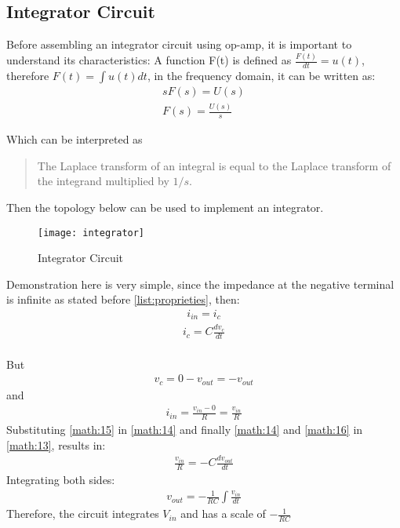 \documentclass[journal]{IEEEtran}
\begin{document}
        \subsection{Integrator Circuit}
            \par Before assembling an integrator circuit using op-amp, it is important to understand its characteristics:
            A function F(t) is defined as $\frac{F(t)}{dt} = u(t)$, therefore $F(t) = \int u(t) dt$\cite{fundamental-theorem}\cite{laplace-integrator}, in the frequency domain, it can be written as:
            \begin{align}
                sF(s)=U(s) \label{math:11} \\
                F(s)=\frac{U(s)}{s} \label{math:12}
            \end{align}
            \par Which can be interpreted as
            \begin{quote}
                The Laplace transform of an integral is equal to the Laplace transform of the integrand multiplied by $1/s$.\cite{laplace-quote}
            \end{quote}
            \par Then the topology below can be used to implement an integrator.
            \begin{figure}[H]
                \centering
                \texttt{[image: integrator]}
                \caption{Integrator Circuit}
                \label{fig:integrator}
            \end{figure}
            \par Demonstration here is very simple, since the impedance at the negative terminal is infinite as stated before \ref{list:proprieties}, then:
            \begin{align}
                i_{in} = i_c \label{math:13}
            \end{align}
            \begin{align}
                i_c = C\frac{dv_c}{dt} \label{math:14}
            \end{align}\\
            But 
            \begin{align}
                v_c = 0 - v_{out} = -v_{out} \label{math:15}
            \end{align}
            and
            \begin{align}
                i_{in} = \frac{v_{in} - 0}{R} = \frac{v_{in}}{R} \label{math:16}
            \end{align}
            Substituting \ref{math:15} in \ref{math:14} and finally \ref{math:14} and
            \ref{math:16} in \ref{math:13}, results in:
            \begin{align}
                \frac{v_{in}}{R} = -C\frac{dv_{out}}{dt} \label{math:17}
            \end{align}
            Integrating both sides:
            \begin{align}
                v_{out} = -\frac{1}{RC}\int \frac{v_{in}}{dt}
            \end{align}
            Therefore, the circuit integrates $V_{in}$ and has a scale of $-\frac{1}{RC}$
\end{document}
